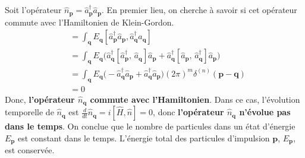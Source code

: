 \documentclass{article}
\numberwithin{equation}{section}
\begin{document}
\subsection{}
Soit l’opérateur $\hat{n}_{\mathbf{p}} = \hat{a}^{\dagger}_{\mathbf{p}}\hat{a}_{\mathbf{p}}$. 
En premier lieu, on cherche à savoir si cet opérateur commute avec l’Hamiltonien de Klein-Gordon. \\
\begin{align*}
        [\hat{n}_{\mathbf{p}}, \hat{H}] &=  \int_{\mathbf{q}}E_{\mathbf{q}}[\hat{a}^{\dagger}_{\mathbf{p}}\hat{a}_{\mathbf{p}}, \hat{a}^{\dagger}_{\mathbf{q}}\hat{a}_{\mathbf{q}}] \\
                                        &= \int_{\mathbf{q}} E_\mathbf{q} \big(\hat{a}^{\dagger}_{\mathbf{q}}[\hat{a}^{\dagger}_{\mathbf{p}},\, \hat{a}_{\mathbf{q}}]\hat{a}_{\mathbf{p}} 
                                        + \hat{a}^{\dagger}_{\mathbf{q}}[\hat{a}_{\mathbf{p}},\, \hat{a}^{\dagger}_{\mathbf{q}}]\hat{a}_{\mathbf{p}} \big) \\
                                        &= \int_{\mathbf{q}} E_\mathbf{q} \big(-\hat{a}^{\dagger}_{\mathbf{q}}\hat{a}_{\mathbf{p}} 
                                        + \hat{a}^{\dagger}_{\mathbf{q}}\hat{a}_{\mathbf{p}} 
                                        \big) 
                                        (2\pi)^{m}\delta^{(n)}(\mathbf{p} - \mathbf{q}) \\
                                        &= 0
\end{align*}
Donc, \textbf{l'opérateur $\hat{n}_{\mathbf{q}}$ commute avec l'Hamiltonien}. Dans ce cas, 
l'évolution temporelle de $\hat{n}_{\mathbf{q}}$ est $\frac{d}{dt} \hat{n}_{\mathbf{q}} = i[\hat{H}, \hat{n}] = 0$, 
donc
\textbf{l'opérateur $\hat{n}_{\mathbf{q}}$ n'évolue pas dans le temps}. On conclue que le nombre de 
particules dans un état d'énergie $E_{\mathbf{p}}$ est constant dans le temps. L'énergie total des particules 
d'impulsion $\mathbf{p}$, $E_{\mathbf{p}}$, est conservée. 
\end{document}
